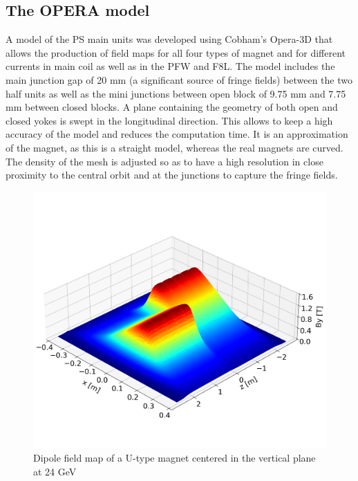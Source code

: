 \documentclass[a4paper,
               biblatex,     %
               keeplastbox,   %
               ]{jacow}
\begin{document}
\subsection{The OPERA model}
A model of the PS main units was developed using Cobham's Opera-3D that allows the production of field maps for all four types of magnet and for different currents in main coil as well as in the PFW and F8L. The model includes the main junction gap of 20 mm (a significant source of fringe fields) between the two half units as well as the mini junctions between open block of 9.75 mm and 7.75 mm between closed blocks. A plane containing the geometry of both open and closed yokes is swept in the longitudinal direction. This allows to keep a high accuracy of the model and reduces the computation time. It is an approximation of the magnet, as this is a straight model, whereas the real magnets are curved. The density of the mesh is adjusted so as to have a high resolution in close proximity to the central orbit and at the junctions to capture the fringe fields. \cite{anglada_reference_2019}

\begin{figure}[!htb]
   \centering
   \includegraphics*[width=1.0\columnwidth, trim={0 2.9cm 0 4.3cm},clip]{dipole_field.png}
   \caption{Dipole field map of a U-type magnet centered in the vertical plane at 24 GeV}
   \label{fig:dipole_field}
\end{figure}
\end{document}
